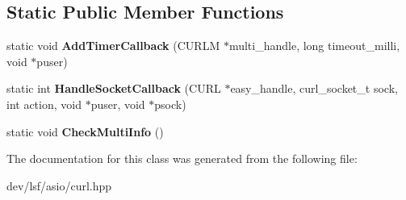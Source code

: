 \subsection*{Static Public Member Functions}
\begin{DoxyCompactItemize}
\item 
\hypertarget{classlsf_1_1asio_1_1CurlMulti_a880d82cb94ec97050d8cc96cad33ced6}{
static void {\bfseries AddTimerCallback} (CURLM $\ast$multi\_\-handle, long timeout\_\-milli, void $\ast$puser)}
\label{classlsf_1_1asio_1_1CurlMulti_a880d82cb94ec97050d8cc96cad33ced6}

\item 
\hypertarget{classlsf_1_1asio_1_1CurlMulti_a500dabfe065dc3ff9fd8f1622863890b}{
static int {\bfseries HandleSocketCallback} (CURL $\ast$easy\_\-handle, curl\_\-socket\_\-t sock, int action, void $\ast$puser, void $\ast$psock)}
\label{classlsf_1_1asio_1_1CurlMulti_a500dabfe065dc3ff9fd8f1622863890b}

\item 
\hypertarget{classlsf_1_1asio_1_1CurlMulti_ab364b1523ded58f62c59619dc66680fb}{
static void {\bfseries CheckMultiInfo} ()}
\label{classlsf_1_1asio_1_1CurlMulti_ab364b1523ded58f62c59619dc66680fb}

\end{DoxyCompactItemize}


The documentation for this class was generated from the following file:\begin{DoxyCompactItemize}
\item 
dev/lsf/asio/curl.hpp\end{DoxyCompactItemize}
